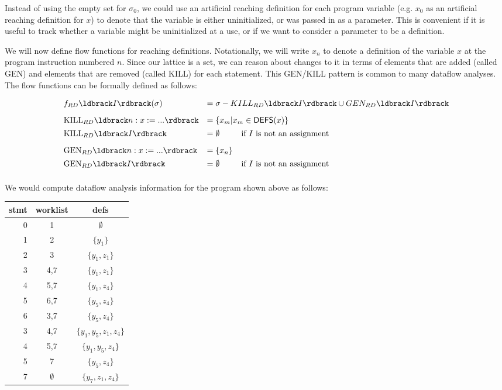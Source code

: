 \documentclass[11pt]{article}
\newcommand{\parg}[1] %
  {\ldbrack #1 \rdbrack}
\begin{document}

Instead of using the empty set for $\sigma_0$, we could use an artificial reaching definition for each program variable (e.g. $x_0$ as an artificial reaching definition for $x$) to denote that the variable is either uninitialized, or was passed in as a parameter.  This is convenient if it is useful to track whether a variable might be uninitialized at a use, or if we want to consider a parameter to be a definition.


We will now define flow functions for reaching definitions.  Notationally, we will write $x_n$ to denote a definition of the variable $x$ at the program instruction numbered $n$.  Since our lattice is a set, we can reason about changes to it in terms of elements that are added (called GEN) and elements that are removed (called KILL) for each statement.  This GEN/KILL pattern is common to many dataflow analyses.  The flow functions can be formally defined as follows:

\[
\begin{array}{lll}

f_{RD}\parg{I}(\sigma) & = \sigma - KILL_{RD}\parg{I} \union GEN_{RD}\parg{I}\\[2ex]

\mbox{KILL}_{RD}\parg{n: x := ...} & = \{ x_m | x_m \in \textsf{DEFS}(x) \}\\[1ex]
\mbox{KILL}_{RD}\parg{I} & = \emptyset ~~~~~~~~ \mbox{if $I$ is not an assignment}\\[2ex]

\mbox{GEN}_{RD}\parg{n: x := ...} & = \{ x_n \}\\[1ex]
\mbox{GEN}_{RD}\parg{I}  & = \emptyset ~~~~~~~~ \mbox{if $I$ is not an assignment}\\[1ex]

\end{array}
\]

We would compute dataflow analysis information for the program shown above as follows:

\begin{centering}
\begin{tabular}{r | c | c}

stmt & worklist & defs \\
\hline
0  & 1   & $\emptyset$ \\
1  & 2   & $\{ y_1 \}$ \\
2  & 3   & $\{ y_1,z_1 \}$ \\
3  & 4,7   & $\{ y_1,z_1 \}$ \\
4  & 5,7   & $\{ y_1,z_4 \}$ \\
5  & 6,7   & $\{ y_5,z_4 \}$ \\
6  & 3,7   & $\{ y_5,z_4 \}$ \\
3  & 4,7   & $\{ y_1,y_5,z_1,z_4 \}$ \\
4  & 5,7   & $\{ y_1,y_5,z_4 \}$ \\
5  & 7     & $\{ y_5,z_4 \}$ \\
7  & $\emptyset$ & $\{ y_7,z_1,z_4 \}$ \\

\end{tabular}
\end{centering}
\end{document}
